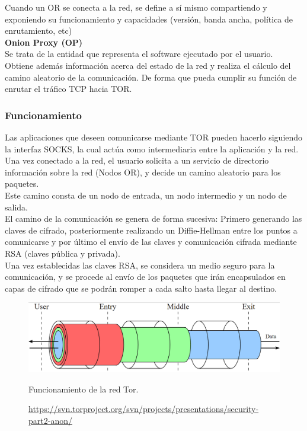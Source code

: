 Cuando un OR se conecta a la red, se define a sí mismo compartiendo y exponiendo su funcionamiento y capacidades (versión, banda ancha, política de enrutamiento, etc) \\

\textbf {Onion Proxy (OP)} \\
Se trata de la entidad que representa el software ejecutado por el usuario. Obtiene además información acerca del estado de la red y realiza el cálculo del camino aleatorio de la comunicación. De forma que pueda cumplir su función de enrutar el tráfico TCP hacia TOR.

\subsubsection {Funcionamiento}

Las aplicaciones que deseen comunicarse mediante TOR pueden hacerlo siguiendo la interfaz SOCKS, la cual actúa como intermediaria entre la aplicación y la red. \\

Una vez conectado a la red, el usuario solicita a un servicio de directorio información sobre la red (Nodos OR), y decide un camino aleatorio para los paquetes. \\ Este camino consta de un nodo de entrada, un nodo intermedio y un nodo de salida. \\

El camino de la comunicación se genera de forma sucesiva: Primero generando las claves de cifrado, posteriormente realizando un Diffie-Hellman entre los puntos a comunicarse	y por último el envío de las claves y comunicación cifrada mediante RSA (claves pública y privada). \\

Una vez establecidas las claves RSA, se considera un medio seguro para la comunicación, y se procede al envío de los paquetes que irán encapsulados en capas de cifrado que se podrán romper a cada salto hasta llegar al destino. \\ 

\begin{figure}[H]
	\centering
	\includegraphics[width=\textwidth]{imagenes/tor_keys}
	\caption{Funcionamiento de la red Tor.}
	\caption*{\small \url {https://svn.torproject.org/svn/projects/presentations/security-part2-anon/}}
	\label{fig:torkeys}
\end{figure}

